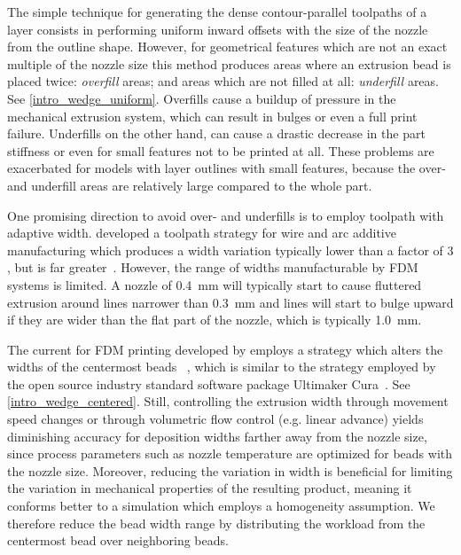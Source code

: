 The simple technique for generating the dense contour-parallel toolpaths of a layer consists in performing uniform inward offsets with the size of the nozzle from the outline shape.
However, for geometrical features which are not an exact multiple of the nozzle size this method produces areas where an extrusion bead is placed twice: \emph{overfill} areas; and areas which are not filled at all: \emph{underfill} areas.
See \cref{intro_wedge_uniform}.
Overfills cause a buildup of pressure in the mechanical extrusion system, which can result in bulges or even a full print failure.
Underfills on the other hand, can cause a drastic decrease in the part stiffness or even for small features not to be printed at all.
These problems are exacerbated for models with layer outlines with small features, because the over- and underfill areas are relatively large compared to the whole part.

One promising direction to avoid over- and underfills is to employ toolpath with adaptive width.
\citeauthor{Ding2016a} developed a toolpath strategy for wire and arc additive manufacturing which produces a width variation typically lower than a factor of $3$, but is  far greater~\cite{Ding2016a,Xiong2019}.
However, the range of widths manufacturable by FDM systems is limited.
A nozzle of \SI{0.4}{\milli\meter} will typically start to cause fluttered extrusion around lines narrower than \SI{0.3}{\milli\meter} and lines will start to bulge upward if they are wider than the flat part of the nozzle, which is typically \SI{1.0}{\milli\meter}.

The current  for FDM printing developed by \citeauthor{Jin2017JMS} employs a strategy which alters the widths of the centermost beads ~\cite{Jin2017JMS},
which is similar to the strategy employed by the open source industry standard software package Ultimaker Cura~\cite{cura}.
See \cref{intro_wedge_centered}.
Still, controlling the extrusion width through movement speed changes or through volumetric flow control (e.g. linear advance) yields diminishing accuracy for deposition widths farther away from the nozzle size,
since process parameters such as nozzle temperature are optimized for beads with the nozzle size.
Moreover, reducing the variation in width is beneficial for limiting the variation in mechanical properties of the resulting product, meaning it conforms better to a simulation which employs a homogeneity assumption.
{We therefore reduce the bead width range by distributing the workload from the centermost bead over neighboring beads.}

